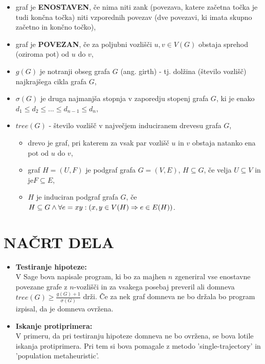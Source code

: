 \documentclass[11pt, a4paper]{article}
\begin{document}
\begin{itemize}
	\item graf je \textbf{ENOSTAVEN}, če nima niti zank (povezava, katere začetna točka je tudi končna točka) niti vzporednih povezav (dve povezavi, ki imata skupno začetno in končno točko),
	\item graf je \textbf{POVEZAN}, če za poljubni vozlišči $u , v \in V(G)$ obstaja sprehod (oziroma pot) od $u$ do $v$,
	\item $g(G)$ je notranji obseg grafa $G$ (ang. girth) - tj. dolžina (število vozlišč) najkrajšega cikla grafa $G$,
	\item $\sigma(G)$ je druga najmanjša stopnja v zaporedju stopenj grafa $G$, ki je enako $d_1 \leq d_2 \leq ... \leq d_{n-1} \leq d_n $,
	\item  $tree(G)$  -  število vozlišč v največjem induciranem drevesu grafa $G$,
	\begin{itemize}
		\item drevo je graf, pri katerem za vsak par vozlišč $u$ in $v$ obstaja natanko ena pot od $u$ do $v$,
		\item graf $H = (U, F)$ je podgraf grafa $G = (V, E)$, $H \subseteq G$, če velja $U \subseteq V$ in je$ F \subseteq E$,
		\item $H$ je induciran podgraf grafa $G$, če $H \subseteq G \land \forall e = xy : \\(x , y \in V(H) \Rightarrow e \in E(H))$.
	\end{itemize}
\end{itemize}


\newpage
\section{\textbf{NAČRT DELA}}

\begin{itemize}
\item \textbf{Testiranje hipoteze:}\\ V Sage bova napisale program, ki bo za majhen $n$ zgeneriral vse enostavne povezane grafe z $n$-vozlišči in za vsakega posebaj preveril ali domneva $tree(G) \geq \frac{g(G) + 1}{\sigma(G)}$ drži. Če za nek graf domneva ne bo držala bo program izpisal, da je domneva ovržena.
\item \textbf{Iskanje protiprimera:}\\V primeru, da pri testiranju hipoteze domneva ne bo ovržena, se bova lotile iskanja protiprimera. Pri tem si bova  pomagale z  metodo 'single-trajectory' in 'population metaheuristic'.

\end{itemize}
\end{document}
